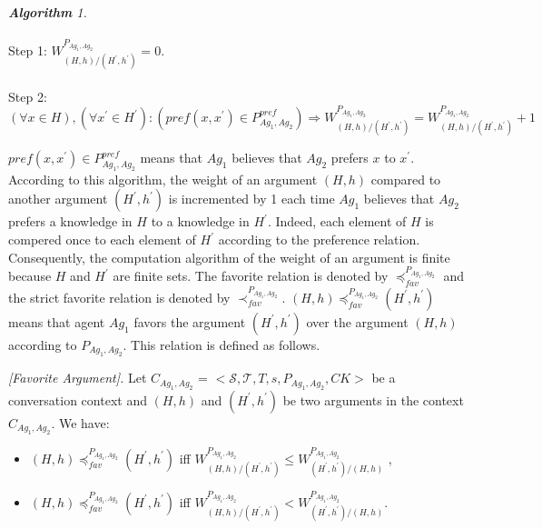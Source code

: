 \begin{algorithm}{\emph{\textbf{Algorithm} 1.}} \label{algorithm1}\\
\\ Step 1:  $ W_{(H,h)/(H^{\prime},h^{\prime})}^{P_{Ag_1,Ag_2}} = 0 . $ \\
\\Step 2:  $(\forall x \in H),(\forall x^{\prime}  \in H^{\prime} ):
 ( pref(x,x^{\prime}) \in P_{Ag_1,Ag_2}^{pref})\Rightarrow W_{(H,h)/(H^{\prime},h^{\prime})}^{P_{Ag_1,Ag_2}} = W_{(H,h)/(H^{\prime},h^{\prime})}^{P_{Ag_1,Ag_2}}  +  1 $
\end{algorithm}

$pref(x,x^{\prime}) \in P_{Ag_1,Ag_2}^{pref} $ means that $Ag_1$ believes that $Ag_2$ prefers $x$ to $x^{\prime}$. According to
this algorithm, the weight of an argument $(H, h)$ compared to another argument $(H^{\prime}, h^{\prime})$ is incremented by 1
each time $Ag_1$ believes that $Ag_2$ prefers a knowledge in $H$ to a knowledge in $H^{\prime}$. Indeed, each element of $H$ is
compered once to each element of $H^{\prime}$ according to the preference relation. Consequently, the computation algorithm of
the weight of an argument is finite because $H$ and $H^{\prime}$ are finite sets. The favorite relation is denoted by
$\preceq_{fav}^{P_{Ag_1,Ag_2}}$ and the strict favorite relation is denoted by $\prec_{fav}^{P_{Ag_1,Ag_2}}$.  $(H, h)
\preceq_{fav}^{P_{Ag_1,Ag_2}}  (H^{\prime},h^{\prime})$ means that agent $Ag_1$ favors the argument $(H^{\prime},h^{\prime})$ over
the argument $(H, h)$ according to $P_{Ag_1,Ag_2}$. This relation is defined as follows.

\begin{definition}{\emph{[Favorite Argument]. }} \label{favorite}
Let $C_{Ag_1,Ag_2}$ = $\big<\mathcal{S},\mathcal{T},T, s,P_{Ag_1,Ag_2},CK\big>$ be a conversation context and $(H, h)$
and $(H^{\prime},h^{\prime})$ be two arguments in the context $C_{Ag_1,Ag_2}$. We have:
\begin{itemize}
\item $(H, h)\preceq _{fav}^{P_{Ag_1,Ag_2}} (H^{\prime},h^{\prime})$ iff   $ W_{(H,h)/(H^{\prime},h^{\prime})}^{P_{Ag_1,Ag_2}} \leq W_{(H^{\prime},h^{\prime})/(H,h)}^{P_{Ag_1,Ag_2}}$ , \\
\item $(H, h)\preceq _{fav}^{P_{Ag_1,Ag_2}} (H^{\prime},h^{\prime})$ iff   $ W_{(H,h)/(H^{\prime},h^{\prime})}^{P_{Ag_1,Ag_2}} < W_{(H^{\prime},h^{\prime})/(H,h)}^{P_{Ag_1,Ag_2}}$.
\end{itemize}
\end{definition}

